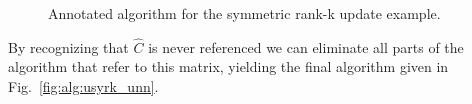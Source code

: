 \renewcommand{\beforeupdate}{
\FlaThreeByThreeTL{ C_{00} }  { c_{01} }  { C_{02} }
                  {\undetermined}{ \gamma_{11}}     { c_{12}^{T} }
                  { \undetermined }  { \undetermined }  { C_{22} }
=
\FlaTwoByTwo{ \FlaTwoByTwoSingleLine{ \hat{C}_{00} }   { \hat{c}_{01} }
                           { \undetermined} { \hat{\gamma}_{11}   } }   
            { \FlaTwoByOneSingleLine{ \hat{C}_{02} }{ \hat{c}_{12}^{T} } }
            { \undetermined }  
            { A_2 A_2^{T} + \hat{C}_{22}}
\wedge \ldots
}

\renewcommand{\afterupdate}{
\FlaThreeByThreeBR{ C_{00} }  { c_{01} }  { C_{02} }
                  { \undetermined }{ \gamma_{11}}     { c_{12}^{T} }
                  { \undetermined }  { \undetermined }         { C_{22}}
=
\FlaTwoByTwo { \hat{C}_{00} }
             { \FlaOneByTwoSingleLine{ \hat{c}_{01} }{ \hat{C}_{02} } }
             { \undetermined }
             { \FlaTwoByTwoSingleLine{ \hat{\gamma}_{11} + a_1^T a_1 }{ a_1^T A_2^T + \hat{c}_{12}^{T} }
                                     { \undetermined }{ A_2 A_2^{T} + \hat{C}_{22}}}
\wedge \ldots
}

\renewcommand{\update}{
\begin{minipage}[t]{4in}
\noindent
$ \gamma_{11} \becomes \gamma_{11} + a_1^T a_1 $\\
$ c_{12} \becomes c_{12} +  A_2 a_1 $\\
\end{minipage}
}


\begin{figure}[htbp]
\worksheet
\caption{Annotated algorithm for the symmetric rank-k update example.}
\label{fig:ws:usyrk_unn}
\end{figure}

By recognizing that $ \hat{C} $ is never referenced we can eliminate
all parts of the algorithm that refer to this matrix, yielding the
final algorithm given in Fig.~\ref{fig:alg:usyrk_unn}.


\renewcommand{\partitionings}{
$ 
C \rightarrow \FlaTwoByTwo{ C_{TL} }{ C_{TR} }
                          { C_{TR}^{T} }{ C_{BR} }
$
and
$ 
A \rightarrow \FlaTwoByOne{ A_{T} }
                          { A_{B} }
$
}
\renewcommand{\partitionsizes}{
$ A_{B} $ has $ 0 $ rows
and $ C_{BR} $ is $ 0 \times 0 $
}

